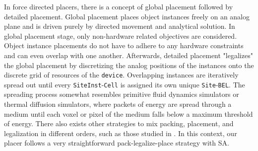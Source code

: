 In force directed placers, there is a concept of global placement followed by detailed placement.
Global placement places object instances freely on an analog plane and is driven purely by directed movement and analytical solution.
In global placement stage, only non-hardware related objectives are considered. 
Object instance placements do not have to adhere to any hardware constraints and can even overlap with one another.
Afterwards, detailed placement "legalizes" the global placement by discretizing the analog positions of the instances onto the discrete grid of resources of the \texttt{device}.
Overlapping instances are iteratively spread out until every \texttt{SiteInst}-\texttt{Cell} is assigned its own unique \texttt{Site}-\texttt{BEL}.
The spreading process somewhat resembles primitive fluid dynamics simulators or thermal diffusion simulators, where packets of energy are spread through a medium until each voxel or pixel of the medium falls below a maximum threshold of energy. 
There also exists other strategies to mix packing, placement, and legalization in different orders, such as those studied in \cite{ExplicitPacking}. 
In this context, our placer follows a very straightforward pack-legalize-place strategy with SA. 




